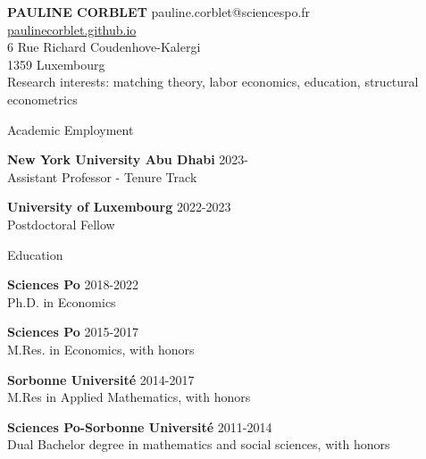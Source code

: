 \documentclass{resume} %
\begin{document}
{\bf \large PAULINE CORBLET} \hfill pauline.corblet@sciencespo.fr\\
{\phantom{smth}} \hfill \href{https://paulinecorblet.github.io}{paulinecorblet.github.io} \\
6 Rue Richard Coudenhove-Kalergi \\ 
1359 Luxembourg \\

{\large Research interests: matching theory, labor economics, education, structural econometrics}


\begin{rSection}{Academic Employment}

{\bf New York University Abu Dhabi} \hfill {2023-} \\
  Assistant Professor - Tenure Track

{\bf University of Luxembourg} \hfill {2022-2023} \\
Postdoctoral Fellow

\end{rSection}

\begin{rSection}{Education}

{\bf Sciences Po} \hfill {2018-2022}
\\ Ph.D. in Economics

{\bf Sciences Po} \hfill {2015-2017}
\\ M.Res. in Economics, with honors

{\bf Sorbonne Université} \hfill {2014-2017}
\\ M.Res in Applied Mathematics, with honors

{\bf Sciences Po-Sorbonne Université} \hfill {2011-2014}
\\ Dual Bachelor degree in mathematics and social sciences, with honors


\end{rSection}
%
%
%
\end{document}
